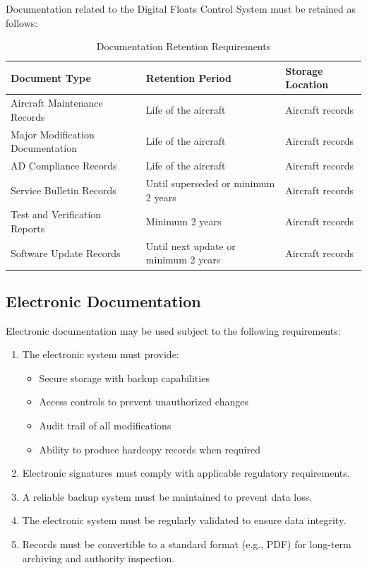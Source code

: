 \documentclass[12pt,a4paper,twoside,openright]{book}
\newcommand{\tabletextfont}{\normalfont\rmfamily}
\newcommand{\tableheadfont}{\normalfont\bfseries}
\begin{document}
Documentation related to the Digital Floats Control System must be retained as follows:

\begin{table}[h]
\centering
\setlength{\tabcolsep}{5pt} %
\begin{tabular}{|p{}|p{}|p{}|}
\hline
\tableheadfont\textbf{Document Type} & \tableheadfont\textbf{Retention Period} & \tableheadfont\textbf{Storage Location} \\
\hline
\tabletextfont Aircraft Maintenance Records & Life of the aircraft & Aircraft records \\
\hline
\tabletextfont Major Modification Documentation & Life of the aircraft & Aircraft records \\
\hline
\tabletextfont AD Compliance Records & Life of the aircraft & Aircraft records \\
\hline
\tabletextfont Service Bulletin Records & Until superseded or minimum 2 years & Aircraft records \\
\hline
\tabletextfont Test and Verification Reports & Minimum 2 years & Aircraft records \\
\hline
\tabletextfont Software Update Records & Until next update or minimum 2 years & Aircraft records \\
\hline
\end{tabular}
\caption{Documentation Retention Requirements}
\end{table}

\subsection{Electronic Documentation}

Electronic documentation may be used subject to the following requirements:

\begin{enumerate}
    \item The electronic system must provide:
    \begin{itemize}
        \item Secure storage with backup capabilities
        \item Access controls to prevent unauthorized changes
        \item Audit trail of all modifications
        \item Ability to produce hardcopy records when required
    \end{itemize}
    
    \item Electronic signatures must comply with applicable regulatory requirements.
    
    \item A reliable backup system must be maintained to prevent data loss.
    
    \item The electronic system must be regularly validated to ensure data integrity.
    
    \item Records must be convertible to a standard format (e.g., PDF) for long-term archiving and authority inspection.
\end{enumerate}
\end{document}
